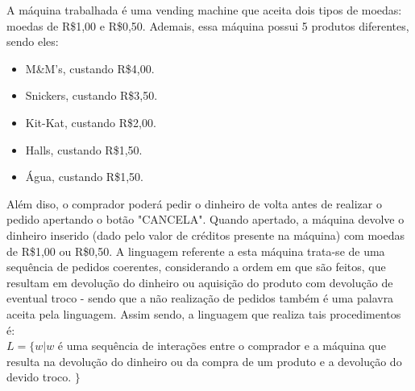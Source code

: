 \documentclass{article}
\begin{document}
\par A m\'aquina trabalhada \'e uma vending machine que aceita dois tipos de moedas: moedas de R\$1,00 e R\$0,50. Ademais, essa m\'aquina possui 5 produtos diferentes, sendo eles:
\begin{itemize}
  \item M\&M's, custando R\$4,00.
  \item Snickers, custando R\$3,50.
  \item Kit-Kat, custando R\$2,00.
  \item Halls, custando R\$1,50.
  \item \'Agua, custando R\$1,50.
\end{itemize}
Al\'em diso, o comprador poder\'a pedir o dinheiro de volta antes de realizar o pedido apertando o bot\~ao "CANCELA". Quando apertado, a m\'aquina devolve o dinheiro inserido (dado pelo valor de cr\'editos presente na m\'aquina) com moedas de R\$1,00 ou R\$0,50. \newline
A linguagem referente a esta m\'aquina trata-se de uma sequ\^encia de pedidos coerentes, considerando a ordem em que s\~ao feitos, que resultam em devolu\c{c}\~ao do dinheiro ou aquisi\c{c}\~ao do produto com devolu\c{c}\~ao de eventual troco - sendo que a n\~ao realiza\c{c}\~ao de pedidos tamb\'em \'e uma palavra aceita pela linguagem. \newline
Assim sendo, a linguagem que realiza tais procedimentos \'e: \\
$L = \{ w | w$ \'e uma sequ\^encia de intera\c{c}\~oes entre o comprador e a m\'aquina que resulta na devolu\c{c}\~ao do dinheiro ou da compra de um produto e a devolu\c{c}\~ao do devido troco. $\}$
\end{document}
